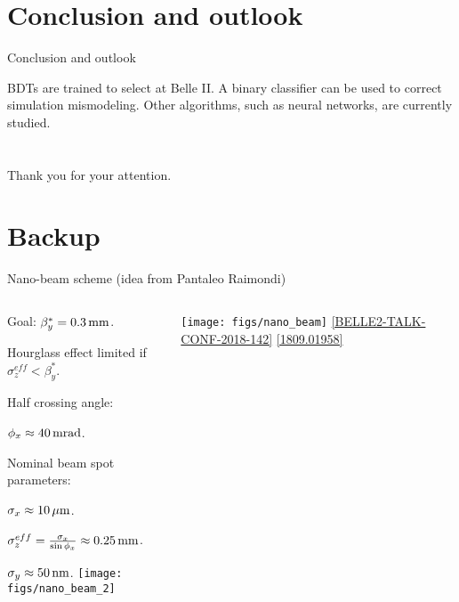\section{Conclusion and outlook}
\begin{frame}{Conclusion and outlook}
\bi
\item BDTs are trained to select \BKnn at Belle II.
\itemi A binary classifier can be used to correct simulation mismodeling.
\itemi Other algorithms, such as neural networks, are currently studied.	
\ei
\end{frame}
\section*{}
\begin{frame}{}
\centering
\Large Thank you for your attention.
\end{frame}
\section*{Backup}
\begin{frame}[noframenumbering]{Nano-beam scheme (idea from Pantaleo Raimondi)}
\begin{columns}
\begin{column}{0.52\linewidth} 
{\small
\bi
\item Goal: $\beta_y^*=0.3{\rm \,mm}$.
\item Hourglass effect limited if $\sigma^{eff}_z<\beta_y^*$.
\item Half crossing angle:
\bi
\item $\phi_x\approx40\rm \,mrad$.
\ei
\item Nominal beam spot parameters:
\bi
\item $\sigma_x\approx10{\,\mu\rm m}$.
\item $\sigma^{eff}_z=\frac{\sigma_x}{\sin\phi_x}\approx0.25{\rm \,mm}$.
\item $\sigma_y\approx50{\rm \,nm}$.
\ei
\ei
\texttt{[image: figs/nano\_beam\_2]} 
}
\end{column}
\begin{column}{0.48\linewidth}
\texttt{[image: figs/nano\_beam]} 
\small\href{https://docs.belle2.org/record/1212?ln=en}{\color{blue!40!gray} [BELLE2-TALK-CONF-2018-142]}
\href{https://arxiv.org/abs/1809.01958}{\color{blue!40!gray} [1809.01958]}
\end{column}
\end{columns}
\end{frame}

